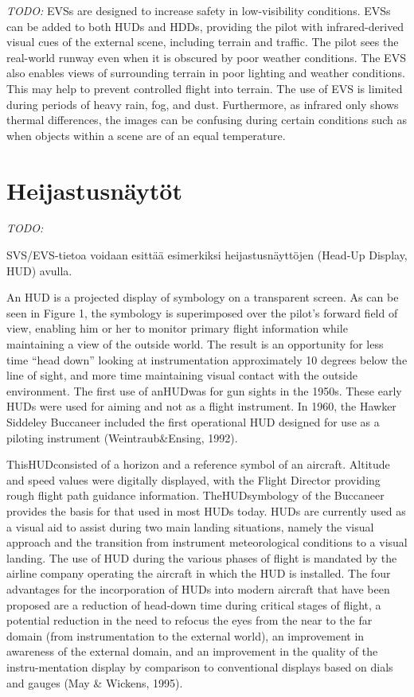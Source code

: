 \documentclass[utf8,bachelor,manualbib]{gradu3}
\begin{document}
\emph{TODO:}
EVSs are designed to increase safety in low-visibility conditions. EVSs can be
added to both HUDs and HDDs, providing the pilot with infrared-derived visual
cues of the external scene, including terrain and traffic. The pilot sees the
real-world runway even when it is obscured by poor weather conditions. The
EVS also enables views of surrounding terrain in poor lighting and weather conditions.
This may help to prevent controlled flight into terrain.
The use of EVS is limited during periods of heavy rain, fog, and dust. Furthermore,
as infrared only shows thermal differences, the images can be confusing during
certain conditions such as when objects within a scene are of an equal
temperature.\citep{crawford2006}

\section{Heijastusnäytöt} \emph{TODO:}

SVS/EVS-tietoa voidaan esittää esimerkiksi heijastusnäyttöjen (Head-Up Display, HUD) avulla.

An HUD is a projected display of symbology on a transparent screen. As can be
seen in Figure 1, the symbology is superimposed over the pilot’s forward field
of view, enabling him or her to monitor primary flight information while maintaining
a view of the outside world. The result is an opportunity for less time
“head down” looking at instrumentation approximately 10 degrees below the line of
sight, and more time maintaining visual contact with the outside environment.
The first use of anHUDwas for gun sights in the 1950s. These early HUDs were
used for aiming and not as a flight instrument. In 1960, the Hawker Siddeley Buccaneer
included the first operational HUD designed for use as a piloting instrument
(Weintraub\&Ensing, 1992).

ThisHUDconsisted of a horizon and a reference symbol
of an aircraft. Altitude and speed values were digitally displayed, with the Flight
Director providing rough flight path guidance information. TheHUDsymbology of
the Buccaneer provides the basis for that used in most HUDs today.
HUDs are currently used as a visual aid to assist during two main landing situations,
namely the visual approach and the transition from instrument meteorological
conditions to a visual landing. The use of HUD during the various phases of
flight is mandated by the airline company operating the aircraft in which the HUD
is installed. The four advantages for the incorporation of HUDs into modern aircraft
that have been proposed are a reduction of head-down time during critical
stages of flight, a potential reduction in the need to refocus the eyes from the near
to the far domain (from instrumentation to the external world), an improvement in
awareness of the external domain, and an improvement in the quality of the instru-mentation display by comparison to conventional displays based on dials and
gauges (May \& Wickens, 1995).
\end{document}
